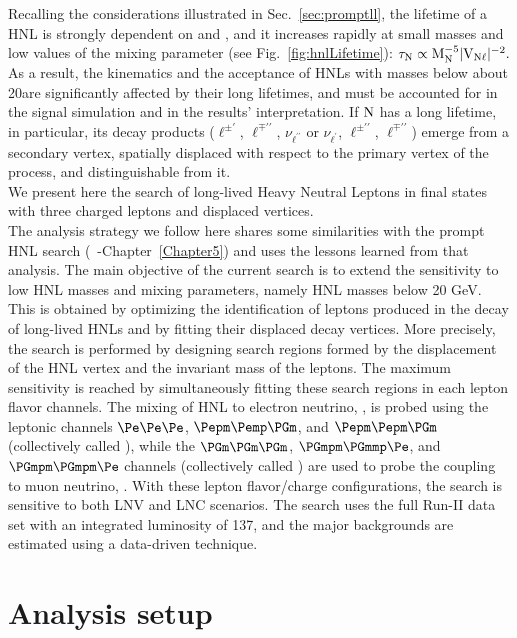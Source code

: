 Recalling the considerations illustrated in Sec.~\ref{sec:promptll}, the lifetime of a HNL is strongly dependent on \mhnl and \mixpar,
and it increases rapidly at small masses and low values of the mixing
parameter (see Fig.~\ref{fig:hnlLifetime}):
\(\tau_\mathrm{N}\propto\mathrm{M_{\mathrm{N}}^{-5}|V_{\mathrm{N}\ell}|^{-2}}.\)
As a result, the kinematics and the acceptance of HNLs with masses
below about 20\GeV are significantly affected by their long lifetimes,
and must be accounted for in the signal simulation and in the results'
interpretation.
If $\mathrm{N}$ has a long lifetime, in particular, its decay products
($\ell^{\pm\prime}$, $\ell^{\mp\prime\prime}$, $\nu_{\ell^{\prime\prime}}$ or
$\nu_{\ell^{\prime}}$, $\ell^{\pm\prime\prime}$, $\ell^{\mp\prime\prime}$)
emerge from a secondary vertex, spatially displaced with respect to
the primary vertex of the process, and distinguishable from it.\\

We present here the search of long-lived Heavy Neutral Leptons in final states
with three charged leptons and displaced vertices. \\
The analysis strategy we follow here shares some similarities with the
prompt HNL search (~\cite{Sirunyan:2018mtv}-Chapter~\ref{Chapter5})
and uses the lessons learned from that
analysis. 
The main objective of the current search is to extend the
sensitivity to low HNL masses and mixing parameters, namely HNL masses
below 20 GeV. This is obtained by optimizing the identification
of leptons produced in the decay of long-lived HNLs and by fitting
their displaced decay vertices. More precisely, the search is
performed by designing search regions formed by the displacement of
the HNL vertex and the invariant mass of the \displ leptons. The
maximum sensitivity is reached by simultaneously fitting these search
regions in each lepton flavor channels. The mixing of HNL to electron
neutrino, \mixpare, is probed using the leptonic channels 
$\Pe\Pe\Pe$, $\Pepm\Pemp\PGm$, and $\Pepm\Pepm\PGm$ (collectively
called \eex),
while the $\PGm\PGm\PGm$,  $\PGmpm\PGmmp\Pe$, and $\PGmpm\PGmpm\Pe$
channels (collectively called \mmx) are used to probe the coupling to
muon neutrino, \mixparm.
With these lepton flavor/charge configurations, the search is
sensitive to both LNV and LNC scenarios.
The search uses the full Run-II data set with an integrated luminosity
of 137\fbinv, and the major backgrounds are estimated using a
data-driven technique.

\section{Analysis setup}
